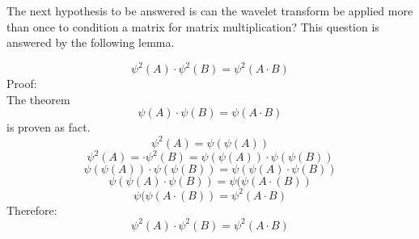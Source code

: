The next hypothesis to be answered is can the wavelet transform be applied more than once to condition a matrix for matrix multiplication?  This question is answered by the following lemma.

\[ \psi ^2 (A) \cdot \psi^2 (B)  = \psi^2(A\cdot B) \]
Proof: \\
The theorem \[ \psi(A) \cdot \psi(B) = \psi (A\cdot B) \] is proven as fact.
\[ \psi^2(A) = \psi(\psi (A))\]
\[ \psi^2 (A) =\cdot \psi^2 (B) = \psi(\psi(A)) \cdot \psi (\psi (B))  \]
\[ \psi(\psi(A)) \cdot \psi (\psi (B)) = \psi (\psi(A) \cdot \psi(B) ) \]
\[ \psi (\psi(A) \cdot \psi(B) ) = \psi (\psi(A \cdot (B))  \]
\[ \psi (\psi(A \cdot (B)) = \psi^2(A \cdot B) \]
Therefore: 
\[ \psi ^2 (A) \cdot \psi^2 (B)= \psi^2(A \cdot B) \]


% 
